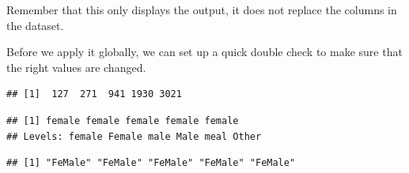 \documentclass[
]{book}
\newenvironment{Shaded}{\begin{snugshade}}{\end{snugshade}}
\newcommand{\CommentTok}[1]{\textcolor[rgb]{0.56,0.35,0.01}{\textit{#1}}}
\newcommand{\FunctionTok}[1]{\textcolor[rgb]{0.13,0.29,0.53}{\textbf{#1}}}
\newcommand{\NormalTok}[1]{#1}
\newcommand{\OtherTok}[1]{\textcolor[rgb]{0.56,0.35,0.01}{#1}}
\newcommand{\SpecialCharTok}[1]{\textcolor[rgb]{0.81,0.36,0.00}{\textbf{#1}}}
\newcommand{\StringTok}[1]{\textcolor[rgb]{0.31,0.60,0.02}{#1}}
\begin{document}
Remember that this only displays the output, it does not replace the columns in the dataset.

Before we apply it globally, we can set up a quick double check to make sure that the right values are changed.

\begin{Shaded}
\end{Shaded}

\begin{verbatim}
## [1]  127  271  941 1930 3021
\end{verbatim}

\begin{Shaded}
\end{Shaded}

\begin{verbatim}
## [1] female female female female female
## Levels: female Female male Male meal Other
\end{verbatim}

\begin{Shaded}
\end{Shaded}

\begin{verbatim}
## [1] "FeMale" "FeMale" "FeMale" "FeMale" "FeMale"
\end{verbatim}
\end{document}
